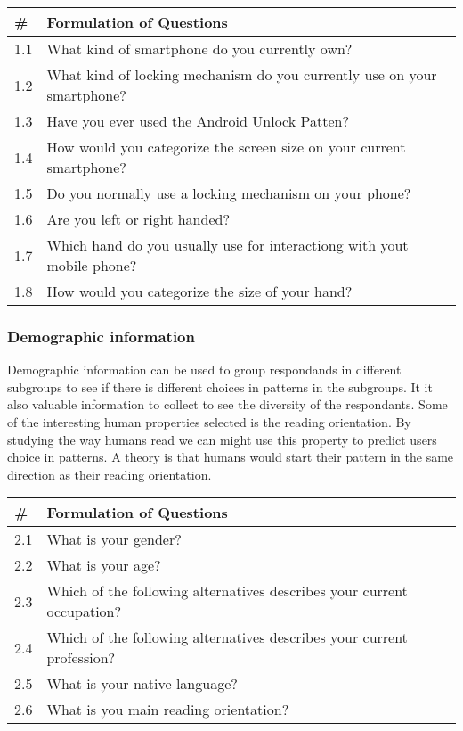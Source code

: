    \begin{tabular}{| p{1cm} | p{10cm} |}
        \hline
        {\bf \#} & {\bf Formulation of Questions} \\ \hline
        1.1 & What kind of smartphone do you currently own? \\ \hline
        1.2 & What kind of locking mechanism do you currently use on your smartphone? \\ \hline
        1.3 & Have you ever used the Android Unlock Patten? \\ \hline
        1.4 & How would you categorize the screen size on your current smartphone? \\ \hline
        1.5 & Do you normally use a locking mechanism on your phone? \\ \hline
        1.6 & Are you left or right handed? \\ \hline
        1.7 & Which hand do you usually use for interactiong with yout mobile phone? \\ \hline
        1.8 & How would you categorize the size of your hand? \\ \hline
    \end{tabular}

    \subsubsection*{Demographic information}
    Demographic information can be used to group respondands in different subgroups to see if there is different choices in patterns in the subgroups. It it also valuable information to collect to see the diversity of the respondants. Some of the interesting human properties selected is the reading orientation. By studying the way humans read we can might use this property to predict users choice in patterns. A theory is that humans would start their pattern in the same direction as their reading orientation. 

    \begin{tabular}{| p{1cm} | p{10cm} |}
      \hline
      {\bf \#} & {\bf Formulation of Questions} \\ \hline
      2.1 & What is your gender? \\ \hline
      2.2 & What is your age? \\ \hline
      2.3 & Which of the following alternatives describes your current occupation? \\ \hline
      2.4 & Which of the following alternatives describes your current profession? \\ \hline
      2.5 & {\color{red} What is your native language?} \\ \hline 
      2.6 & What is you main reading orientation? \\ \hline
    \end{tabular}

